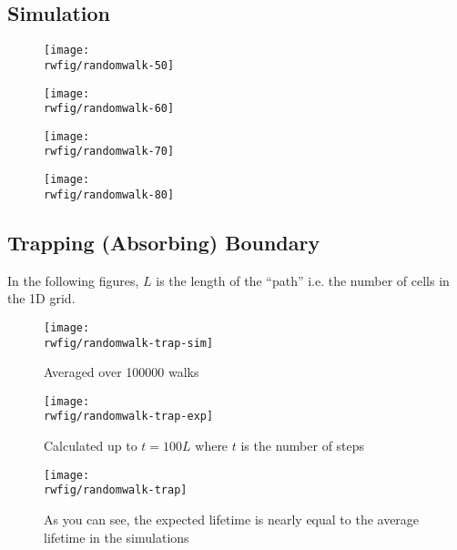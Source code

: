 \documentclass[12pt,a4paper]{article}
\newcommand{\rwfig}{../fig/random-walk}
\begin{document}
	\subsection{Simulation}
	\begin{figure}
		\centering
		\texttt{[image: \\rwfig/randomwalk-50]}
	\end{figure}
	\begin{figure}
		\centering
		\texttt{[image: \\rwfig/randomwalk-60]}
	\end{figure}
	\begin{figure}
		\centering
		\texttt{[image: \\rwfig/randomwalk-70]}
	\end{figure}
	\begin{figure}
		\centering
		\texttt{[image: \\rwfig/randomwalk-80]}
	\end{figure}
	\FloatBarrier
	\subsection{Trapping (Absorbing) Boundary}
	In the following figures, $L$ is the length of the \enquote{path} i.e. the number of cells in the 1D grid.
	\begin{figure}[htb!]
		\centering
		\texttt{[image: \\rwfig/randomwalk-trap-sim]}
		\caption{Averaged over 100000 walks}
	\end{figure}
	\begin{figure}[htb!]
		\centering
		\texttt{[image: \\rwfig/randomwalk-trap-exp]}
		\caption{Calculated up to $t=100L$ where $t$ is the number of steps}
	\end{figure}
	\begin{figure}[htb!]
		\centering
		\texttt{[image: \\rwfig/randomwalk-trap]}
		\caption{As you can see, the expected lifetime is nearly equal to the average lifetime in the simulations}
	\end{figure}
\end{document}
